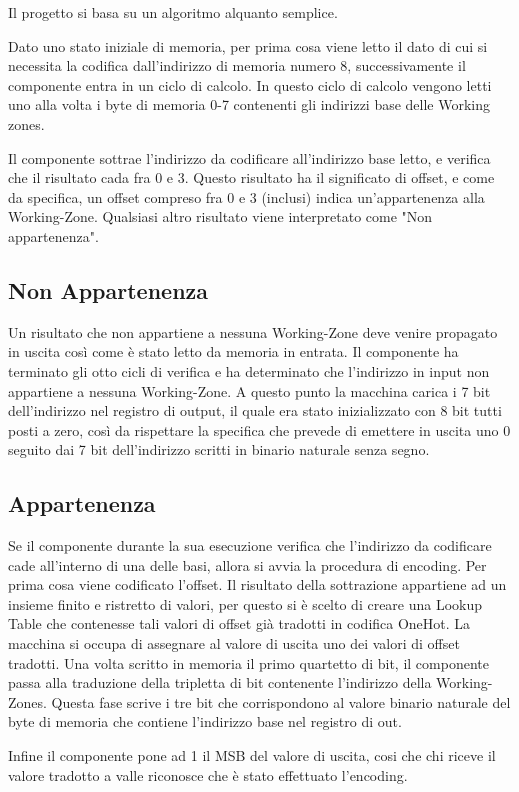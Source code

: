 \documentclass{article}
\begin{document}
\begin{flushleft}


Il progetto si basa su un algoritmo alquanto semplice.
\smallskip

Dato uno stato iniziale di memoria, per prima cosa viene letto il dato di cui si necessita la codifica dall'indirizzo di memoria numero 8, successivamente il componente entra in un ciclo di calcolo. In questo ciclo di calcolo vengono letti uno alla volta i byte di memoria 0-7 contenenti gli indirizzi base delle Working zones.
\smallskip

 Il componente sottrae l'indirizzo da codificare all'indirizzo base letto, e verifica che il risultato cada fra 0 e 3. Questo risultato ha il significato di offset, e come da specifica, un offset compreso fra 0 e 3 (inclusi) indica un'appartenenza alla Working-Zone. Qualsiasi altro risultato viene interpretato come "Non appartenenza".

\bigskip

\subsection{Non Appartenenza}\label{notA}

Un risultato che non appartiene a nessuna Working-Zone deve venire propagato in uscita così come è stato letto da memoria in entrata. Il componente ha terminato gli otto cicli di verifica e ha determinato che l'indirizzo in input non appartiene a nessuna Working-Zone. A questo punto la macchina carica i 7 bit dell'indirizzo nel registro di output, il quale era stato inizializzato con 8 bit tutti posti a zero, così da rispettare la specifica che prevede di emettere in uscita uno 0 seguito dai 7 bit dell'indirizzo scritti in binario naturale senza segno.

\bigskip

\subsection{Appartenenza}\label{app}

Se il componente durante la sua esecuzione verifica che l'indirizzo da codificare cade all'interno di una delle basi, allora si avvia la procedura di encoding. Per prima cosa viene codificato l'offset. Il risultato della sottrazione appartiene ad un insieme finito e ristretto di valori, per questo si è scelto di creare una Lookup Table che contenesse tali valori di offset già tradotti in codifica OneHot. La macchina si occupa di assegnare al valore di uscita uno dei valori di offset tradotti.
Una volta scritto in memoria il primo quartetto di bit, il componente passa alla traduzione della tripletta di bit contenente l'indirizzo della Working-Zones. Questa fase scrive i tre bit che corrispondono al valore binario naturale del byte di memoria che contiene l'indirizzo base nel registro di out.

Infine il componente pone ad 1 il MSB del valore di uscita, cosi che chi riceve il valore tradotto a valle riconosce che è stato effettuato l'encoding.



\end{flushleft}
\end{document}
